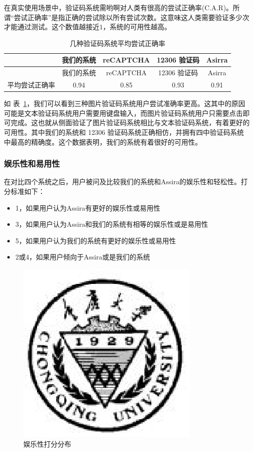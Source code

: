 \documentclass[bachelor,zhspacing]{cqu}  %
\def\tightlist{}
\begin{document}
在真实使用场景中，验证码系统需哟啊对人类有很高的尝试正确率(C.A.R)。所谓``尝试正确率''是指正确的尝试除以所有尝试次数。这意味这人类需要验证多少次才能通过测试。这个数值越接近\(1\)，系统的可用性越高。

\begin{longtable}[]{@{}ccccc@{}}
\caption{\label{tbl:accuracy}几种验证码系统平均尝试正确率
}\tabularnewline
\toprule
& 我们的系统 & reCAPTCHA & 12306 验证码 & Asirra\tabularnewline
\midrule
\endfirsthead
\toprule
& 我们的系统 & reCAPTCHA & 12306 验证码 & Asirra\tabularnewline
\midrule
\endhead
平均尝试正确率 & 0.94 & 0.85 & 0.93 & 0.91\tabularnewline
\bottomrule
\end{longtable}

如
表~\ref{tbl:accuracy}，我们可以看到三种图片验证码系统用户尝试准确率更高。这其中的原因可能是文本验证码系统用户需要用键盘输入，而图片验证码系统用户只需要点击即可完成。这也就从侧面验证了图片验证码系统相比与文本验证码系统，有着更好的可用性。其中我们的系统和
12306
验证码系统正确相仿，并拥有四中验证码系统中最高的精确度。这个数据表明，我们的系统有着很好的可用性。

\subsubsection{娱乐性和易用性}\label{ux5a31ux4e50ux6027ux548cux6613ux7528ux6027}

在对比四个系统之后，用户被问及比较我们的系统和Assira的娱乐性和轻松性。打分标准如下：

\begin{itemize}
\tightlist
\item
  1，如果用户认为Assira有更好的娱乐性或易用性
\item
  3，如果用户认为Assira和我们的系统有相等的娱乐性或是易用性
\item
  5，如果用户认为我们的系统有更好的娱乐性或易用性
\item
  2或4，如果用户倾向于Assira或是我们的系统
\end{itemize}

\begin{figure}[htbp]
\centering
\includegraphics{pic/cqu.eps}
\caption{娱乐性打分分布}\label{fig:entertainment}
\end{figure}
\end{document}
